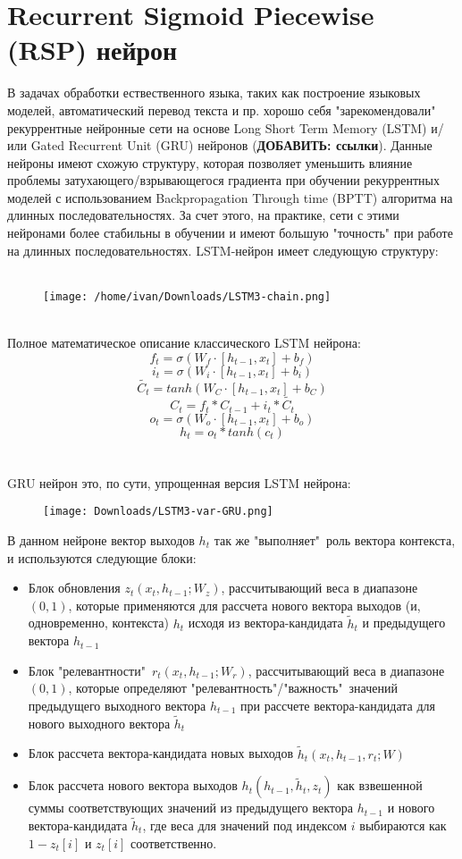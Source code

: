 \documentclass[11pt]{article}
\begin{document}
\section*{Recurrent Sigmoid Piecewise (RSP) нейрон}

В задачах обработки ествественного языка, таких как построение языковых моделей, автоматический перевод текста и пр. хорошо себя "зарекомендовали" рекуррентные нейронные сети на основе Long Short Term Memory (LSTM) и/или Gated Recurrent Unit (GRU) нейронов (\textbf{ДОБАВИТЬ: ссылки}). Данные нейроны имеют схожую структуру, которая позволяет уменьшить влияние проблемы затухающего/взрывающегося градиента при обучении рекуррентных моделей с использованием Backpropagation Through time (BPTT) алгоритма на длинных последовательностях. За счет этого, на практике, сети с этими нейронами более стабильны в обучении и имеют большую "точность" при работе на длинных последовательностях. LSTM-нейрон имеет следующую структуру:
\\
\\
\begin{figure}[h]
\centering
\texttt{[image: /home/ivan/Downloads/LSTM3-chain.png]}
\label{}
\end{figure}
\\
Полное математическое описание классического LSTM нейрона:
$$ f_t = \sigma( W_f \cdot [h_{t-1},x_t] + b_f) $$
$$ i_t = \sigma( W_i \cdot [h_{t-1},x_t] + b_i) $$
$$ \tilde{C_t} = tanh( W_C \cdot [h_{t-1},x_t] + b_C) $$
$$ C_t = f_t * C_{t-1} + i_t * \tilde{C_t} $$
$$ o_t = \sigma( W_o \cdot [h_{t-1},x_t] + b_o) $$
$$ h_t = o_t * tanh(c_t) $$
\\
\\
GRU нейрон это, по сути, упрощенная версия LSTM нейрона:
\begin{figure}[H]
\centering
\texttt{[image: Downloads/LSTM3-var-GRU.png]}
\label{}
\end{figure}
В данном нейроне вектор выходов $h_t$ так же "выполняет"\ роль вектора контекста, и используются следующие блоки:
\begin{itemize}
\item Блок обновления $z_t(x_t,h_{t-1};W_z)$, рассчитывающий веса в диапазоне $(0,1)$, которые применяются для рассчета нового вектора выходов (и, одновременно, контекста) $h_t$ исходя из вектора-кандидата $\tilde{h}_t$ и предыдущего вектора $h_{t-1}$
\item Блок "релевантности"\ $r_t(x_t,h_{t-1};W_r)$, рассчитывающий веса в диапазоне $(0,1)$, которые определяют "релевантность"/"важность"\ значений предыдущего выходного вектора $h_{t-1}$ при рассчете вектора-кандидата для нового выходного вектора $\tilde{h}_t$
\item Блок рассчета вектора-кандидата новых выходов $\tilde{h}_t(x_t,h_{t-1},r_t;W)$
\item Блок рассчета нового вектора выходов $h_t(h_{t-1},\tilde{h}_t,z_t)$ как взвешенной суммы соответствующих значений из предыдущего вектора $h_{t-1}$ и нового вектора-кандидата $\tilde{h}_t$, где веса для значений под индексом $i$ выбираются как $1-z_t[i]$ и $z_t[i]$ соответственно.
\end{itemize}
\end{document}
